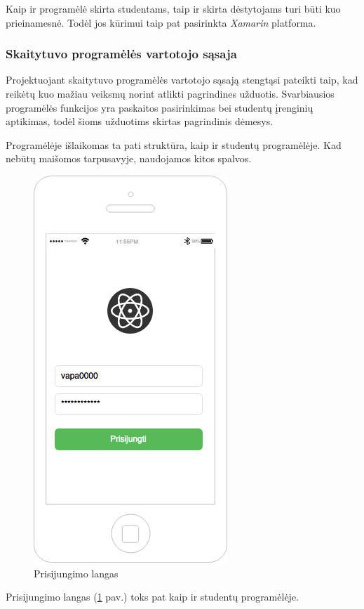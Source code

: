 \documentclass{VUMIFPSkursinis}
\begin{document}
Kaip ir programėlė skirta studentams, taip ir skirta dėstytojams turi būti kuo prieinamesnė. Todėl jos kūrimui taip pat pasirinkta \textit{Xamarin} platforma.

\subsubsection{Skaitytuvo programėlės vartotojo sąsaja}

Projektuojant skaitytuvo programėlės vartotojo sąsają stengtąsi pateikti taip, kad reikėtų kuo mažiau veiksmų norint atlikti pagrindines užduotis. Svarbiausios programėlės funkcijos yra paskaitos pasirinkimas bei studentų įrenginių aptikimas, todėl šioms užduotims skirtas pagrindinis dėmesys.

Programėlėje išlaikomas ta pati struktūra, kaip ir studentų programėlėje. Kad nebūtų maišomos tarpusavyje, naudojamos kitos spalvos.

\begin{figure}[H]
	\centering
	\includegraphics[scale=0.5]{img/kursinio_app_login}
	\caption{Prisijungimo langas}
	\label{img:scannerLoginView}
\end{figure}

Prisijungimo langas (\ref{img:scannerLoginView} pav.) toks pat kaip ir studentų programėlėje.
\end{document}
